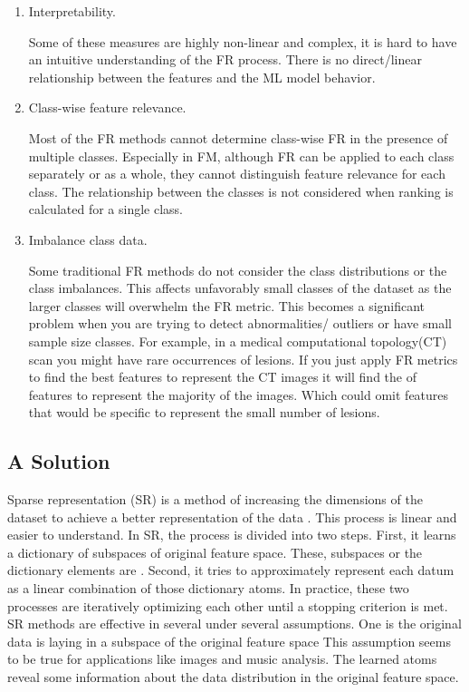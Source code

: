 \documentclass[11pt]{article}
\begin{document}
\begin{enumerate}
    \item Interpretability.
    
    Some of these measures are highly non-linear and complex, it is hard to have an intuitive understanding of the FR process. There is no direct/linear relationship between the features and the ML model behavior.
    
    \item Class-wise feature relevance.
    
    Most of the FR methods cannot determine class-wise FR in the presence of multiple classes. Especially in FM, although FR can be applied to each class separately or as a whole, they cannot distinguish feature relevance for each class. The relationship between the classes is not considered when ranking is calculated for a single class.
    
    \item Imbalance class data.
    
    Some traditional FR methods do not consider the class distributions or the class imbalances. This affects unfavorably small classes of the dataset as the larger classes will overwhelm the FR metric. This becomes a significant problem when you are trying to detect abnormalities/ outliers or have small sample size classes. For example, in a medical computational topology(CT) scan you might have rare occurrences of lesions. If you just apply FR metrics to find the best features to represent the CT images it will find the  of features to represent the majority of the images. Which could omit features that would be specific to represent the small number of lesions.  
\end{enumerate}

\subsection{A Solution}

Sparse representation (SR) is a method of increasing the dimensions of the dataset to achieve a better representation of the data \cite{Elad2010}. This process is linear and easier to understand. In SR, the process is divided into two steps. First, it learns a dictionary of subspaces of original feature space. These, subspaces or the dictionary elements are . Second, it tries to approximately represent each datum as a linear combination of those dictionary atoms. In practice, these two processes are iteratively optimizing each other until a stopping criterion is met. SR methods are effective in several under several assumptions. One is the original data is laying in a subspace of the original feature space This assumption seems to be true for applications like images and music analysis. The learned atoms reveal some information about the data distribution in the original feature space. 
\end{document}
